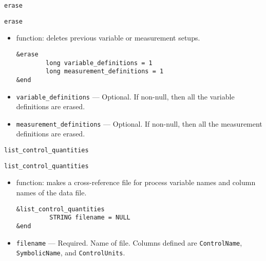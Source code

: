 \begin{itemize}
\begin{itemize}
\begin{latexonly}
\newpage\begin{center}{\Large \verb+erase+}\end{center}
\end{latexonly}
\begin{htmlonly}
\item {\Large \verb+erase+}
\end{htmlonly}
\begin{itemize}
   \item function: deletes previous variable or measurement setups.
\begin{verbatim}
&erase
        long variable_definitions = 1
        long measurement_definitions = 1
&end
\end{verbatim}
   \item {\verb+variable_definitions+} --- Optional. If non-null, then all the variable definitions are erased.
   \item {\verb+measurement_definitions+} --- Optional. If non-null, then all the measurement definitions are erased.
\end{itemize}

\begin{latexonly}
\begin{center}{\Large \verb+list_control_quantities+}\end{center}
\end{latexonly}
\begin{htmlonly}
\item {\Large \verb+list_control_quantities+}
\end{htmlonly}
\begin{itemize}
   \item function: makes a cross-reference file for process variable names and column names of the data file.
\begin{verbatim}
&list_control_quantities
         STRING filename = NULL
&end
\end{verbatim}
   \item {\verb+filename+} --- Required. Name of file. Columns defined are \verb+ControlName+,
                \verb+SymbolicName+, and \verb+ControlUnits+.
\end{itemize}


\end{itemize}
\end{itemize}
